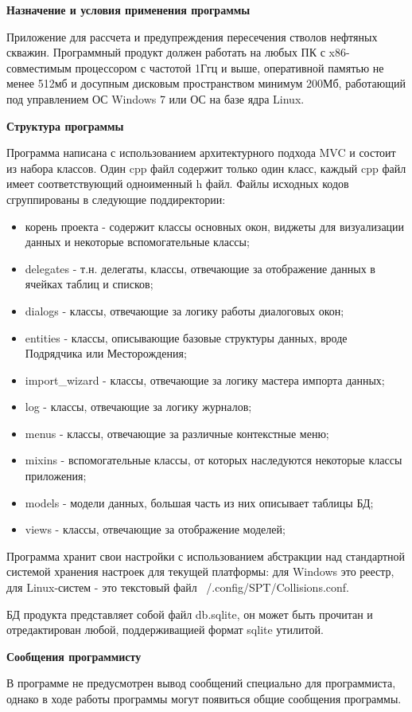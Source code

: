 \textbf{Назначение и условия применения программы}

Приложение для рассчета и предупреждения пересечения стволов нефтяных скважин.
Программный продукт должен работать на любых ПК с x86-совместимым процессором с частотой 1Ггц и выше,
оперативной памятью не менее 512мб и досупным дисковым пространством минимум 200Мб, работающий под
управлением ОС Windows 7 или ОС на базе ядра Linux.

\textbf{Структура программы}

Программа написана с использованием архитектурного подхода MVC и состоит из набора классов. Один cpp файл содержит только
один класс, каждый cpp файл имеет соответствующий одноименный h файл. Файлы исходных кодов сгруппированы в следующие
поддиректории:
\begin{itemize}
  \item корень проекта - содержит классы основных окон, виджеты для визуализации данных и некоторые вспомогательные классы;
  \item delegates - т.н. делегаты, классы, отвечающие за отображение данных в ячейках таблиц и списков;
  \item dialogs - классы, отвечающие за логику работы диалоговых окон;
  \item entities - классы, описывающие базовые структуры данных, вроде Подрядчика или Месторождения;
  \item import\_wizard - классы, отвечающие за логику мастера импорта данных;
  \item log - классы, отвечающие за логику журналов;
  \item menus - классы, отвечающие за различные контекстные меню;
  \item mixins - вспомогательные классы, от которых наследуются некоторые классы приложения;
  \item models - модели данных, большая часть из них описывает таблицы БД;
  \item views - классы, отвечающие за отображение моделей;
\end{itemize}

Программа хранит свои настройки с использованием абстракции над стандартной системой хранения настроек для текущей платформы:
для Windows это реестр, для Linux-систем - это текстовый файл ~/.config/SPT/Collisions.conf.

БД продукта представляет собой файл db.sqlite, он может быть прочитан и отредактирован любой, поддерживащией формат sqlite утилитой.

\textbf{Сообщения программисту}

В программе не предусмотрен вывод сообщений специально для программиста, однако в ходе работы программы могут появиться
общие сообщения программы.

